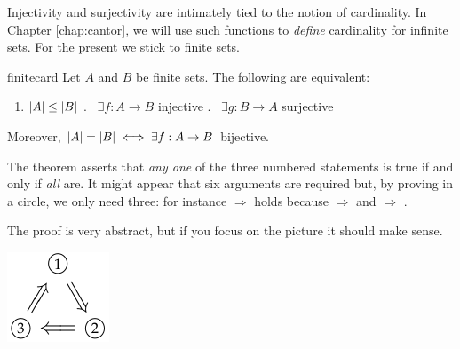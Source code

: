 
Injectivity and surjectivity are intimately tied to the notion of cardinality. In Chapter \ref{chap:cantor}, we will use such functions to \emph{define} cardinality for infinite sets. For the present we stick to finite sets. 

\begin{thm}{}{finitecard}
	Let $A$ and $B$ be finite sets. The following are equivalent:
	\begin{enumerate}\itemsep0pt
	  \item $\left| A\right|\le\left| B\right|$ \qquad{}. \ $\exists f:A\to B$ injective \qquad{}. \ $\exists g:B\to A$ surjective
	\end{enumerate}
	Moreover, $\left| A\right|=\left| B\right|\iff\exists f:A\to B$ bijective.
\end{thm}

\begin{minipage}[t]{0.84\linewidth}\vspace{-3pt}
	The theorem asserts that \emph{any one} of the three numbered statements is true if and only if \emph{all} are. It might appear that six arguments are required but, by proving in a circle, we only need three: for instance  $\Rightarrow$  holds because  $\Rightarrow$  and  $\Rightarrow$ .\par
	The proof is very abstract, but if you focus on the picture it should make sense.
\end{minipage}
\hfill
\begin{minipage}[t]{0.15\linewidth}\vspace{-3pt}
	\flushright\includegraphics{sets-14-circlearg}%
\end{minipage}
\par


